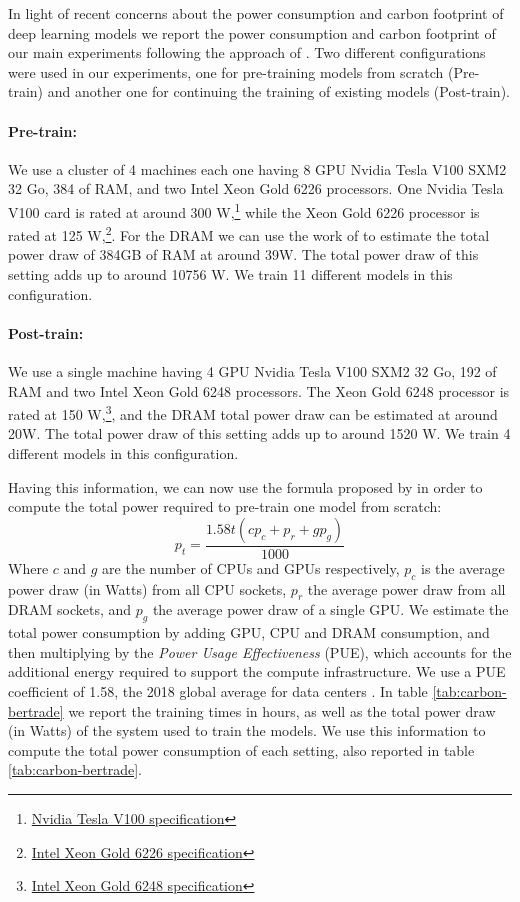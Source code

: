 In light of recent concerns about the power consumption and carbon footprint of deep learning models \citep{schwartz-2020-green, bender-etal-2021-on} we report the power consumption and carbon footprint of our main experiments following the approach of \citet{strubell-etal-2019-energy}. Two different configurations were used in our experiments, one for pre-training models from scratch (Pre-train) and another one for continuing the training of existing models (Post-train).

\paragraph{Pre-train:} We use a cluster of 4 machines each one having 8 GPU Nvidia Tesla V100 SXM2 32 Go, 384 of RAM, and two Intel Xeon Gold 6226 processors. One Nvidia Tesla V100 card is rated at around 300 W,\footnote{\href{https://www.nvidia.com/en-us/data-center/v100/}{ Nvidia Tesla V100 specification}} while the Xeon Gold 6226 processor is rated at 125 W,\footnote{\href{https://ark.intel.com/content/www/us/en/ark/products/193957/intel-xeon-gold-6226-processor-19-25m-cache-2-70-ghz.html}{Intel Xeon Gold 6226 specification}}. For the DRAM we can use the work of \citet{desrochers-etal-2016-a} to estimate the total power draw of 384GB of RAM at around 39W. The total power draw of this setting adds up to around 10756 W. We train 11 different models in this configuration.

\paragraph{Post-train:} We use a single machine having 4 GPU Nvidia Tesla V100 SXM2 32 Go, 192 of RAM and two Intel Xeon Gold 6248 processors. The Xeon Gold 6248 processor is rated at 150 W,\footnote{\href{https://ark.intel.com/content/www/us/en/ark/products/192446/intel-xeon-gold-6248-processor-27-5m-cache-2-50-ghz.html}{Intel Xeon Gold 6248 specification}}, and the DRAM total power draw can be estimated at around 20W. The total power draw of this setting adds up to around 1520 W. We train 4 different models in this configuration.

Having this information, we can now use the formula proposed by \citet{strubell-etal-2019-energy} in order to compute the total power required to pre-train one model from scratch:
\[
    p_t = \frac{1.58t(cp_{c} + p_r + gp_g)}{1000}
\]
Where $c$ and $g$ are the number of CPUs and GPUs respectively, $p_c$ is the average power draw (in Watts) from all CPU sockets, $p_r$ the average power draw from all DRAM sockets, and $p_g$ the average power draw of a single GPU. We estimate the total power consumption by adding GPU, CPU and DRAM consumption, and then multiplying by the \emph{Power Usage Effectiveness} (PUE), which accounts for the additional energy required to support the compute infrastructure. We use a PUE coefficient of 1.58, the 2018 global average for data centers \citep{strubell-etal-2019-energy}. In table \ref{tab:carbon-bertrade} we report the training times in hours, as well as the total power draw (in Watts) of the system used to train the models. We use this information to compute the total power consumption of each setting, also reported in table \ref{tab:carbon-bertrade}.

